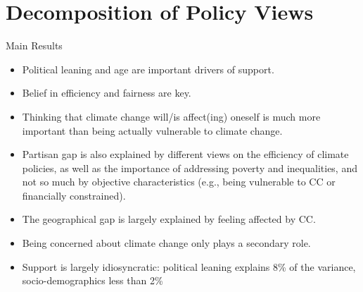\begin{frame}{}%
\begin{table}[h!]
\begin{center}
\scalebox{.46}{}
\end{center}
\end{table}
\end{frame}

\begin{frame}{}%
\begin{table}[h!]
\begin{center}
\scalebox{.45}{}
\end{center}
\end{table}
\end{frame}

\section{Decomposition of Policy Views}


\begin{frame}{Main Results}
\begin{itemize}
	\item Political leaning and age are important drivers of support. \newline
	\item Belief in efficiency and fairness are key.
	\item Thinking that climate change will/is affect(ing) oneself is much more important than being actually vulnerable to climate change. \newline
	\item Partisan gap is also explained by different views on the efficiency of climate policies, as well as the importance of addressing poverty and inequalities, and not so much by objective characteristics (e.g., being vulnerable to CC or financially constrained).
	\item The geographical gap is largely explained by feeling affected by CC.
	\item Being concerned about climate change only plays a secondary role. \newline
	\item Support is largely idiosyncratic: political leaning explains 8\% of the variance, socio-demographics less than 2\%
\end{itemize}
\end{frame}


